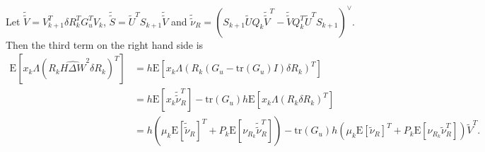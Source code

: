 \documentclass[10pt]{article}
\newcommand{\tr}[1]{\ensuremath{\mathrm{tr}\left( #1 \right)}}
\newcommand{\expect}[1]{\ensuremath{\mathrm{E}\left[ #1 \right]}}
\begin{document}
\noindent Let $\tilde{\tilde{V}} = V_{k+1}^T\delta R_k^TG_u^TV_k$, $\tilde{\tilde{S}} = \tilde{U}^TS_{k+1}\tilde{\tilde{V}}$ and $\tilde{\tilde{\nu}}_R = (S_{k+1}\tilde{U}Q_k\tilde{\tilde{V}}^T - \tilde{\tilde{V}}Q_k^T\tilde{U}^TS_{k+1})^\vee$.
Then the third term on the right hand side is
\begin{align*}
	\expect{x_k\Lambda(R_k\widehat{H\Delta W}^2\delta R_k)^T} &= h\expect{x_k\Lambda(R_k(G_u-\tr{G_u}I)\delta R_k)^T} \\
	&= h\expect{x_k\tilde{\tilde{\nu}}_R^T} - \tr{G_u}h\expect{x_k\Lambda(R_k\delta R_k)^T} \\
	&= h\left(\mu_k\expect{\tilde{\tilde{\nu}}_R}^T + P_k\expect{\nu_{R_k}\tilde{\tilde{\nu}}_R^T}\right) - \tr{G_u}h\left(\mu_k\expect{\tilde{\nu}_R}^T + P_k\expect{\nu_{R_k}\tilde{\nu}_R^T}\right)\tilde{V}^T.
\end{align*}
\end{document}

